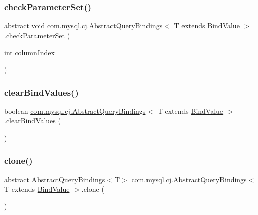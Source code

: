 \subsubsection{\texorpdfstring{check\+Parameter\+Set()}{checkParameterSet()}}
{\footnotesize\ttfamily abstract void \mbox{\hyperlink{classcom_1_1mysql_1_1cj_1_1_abstract_query_bindings}{com.\+mysql.\+cj.\+Abstract\+Query\+Bindings}}$<$ T extends \mbox{\hyperlink{interfacecom_1_1mysql_1_1cj_1_1_bind_value}{Bind\+Value}} $>$.check\+Parameter\+Set (\begin{DoxyParamCaption}\item[{int}]{column\+Index }\end{DoxyParamCaption})\hspace{0.3cm}{\ttfamily [abstract]}}

\mbox{\label{classcom_1_1mysql_1_1cj_1_1_abstract_query_bindings_a5df13f93e579f0771b6515ae24bd26c4}} 
\subsubsection{\texorpdfstring{clear\+Bind\+Values()}{clearBindValues()}}
{\footnotesize\ttfamily boolean \mbox{\hyperlink{classcom_1_1mysql_1_1cj_1_1_abstract_query_bindings}{com.\+mysql.\+cj.\+Abstract\+Query\+Bindings}}$<$ T extends \mbox{\hyperlink{interfacecom_1_1mysql_1_1cj_1_1_bind_value}{Bind\+Value}} $>$.clear\+Bind\+Values (\begin{DoxyParamCaption}{ }\end{DoxyParamCaption})}

\mbox{\label{classcom_1_1mysql_1_1cj_1_1_abstract_query_bindings_a0255791ce812a85734cae2a60d2ec798}} 
\subsubsection{\texorpdfstring{clone()}{clone()}}
{\footnotesize\ttfamily abstract \mbox{\hyperlink{classcom_1_1mysql_1_1cj_1_1_abstract_query_bindings}{Abstract\+Query\+Bindings}}$<$T$>$ \mbox{\hyperlink{classcom_1_1mysql_1_1cj_1_1_abstract_query_bindings}{com.\+mysql.\+cj.\+Abstract\+Query\+Bindings}}$<$ T extends \mbox{\hyperlink{interfacecom_1_1mysql_1_1cj_1_1_bind_value}{Bind\+Value}} $>$.clone (\begin{DoxyParamCaption}{ }\end{DoxyParamCaption})\hspace{0.3cm}{\ttfamily [abstract]}}

